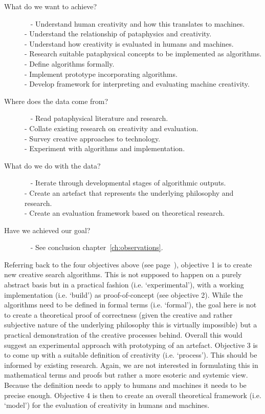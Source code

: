 \begin{description}
  \item[What do we want to achieve?]~
    - Understand human creativity and how this translates to machines.\\
    - Understand the relationship of pataphysics and creativity.\\
    - Understand how creativity is evaluated in humans and machines.\\
    - Research suitable pataphysical concepts to be implemented as algorithms.\\ 
    - Define algorithms formally.\\
    - Implement prototype incorporating algorithms.\\
    - Develop framework for interpreting and evaluating machine creativity.
	\item[Where does the data come from?]~
    - Read pataphysical literature and research.\\
    - Collate existing research on creativity and evaluation.\\
    - Survey creative approaches to technology.\\
    - Experiment with algorithms and implementation.
	\item[What do we do with the data?]~
    - Iterate through developmental stages of algorithmic outputs.\\
    - Create an artefact that represents the underlying philosophy and research.\\
    - Create an evaluation framework based on theoretical research.
  \item[Have we achieved our goal?]~
    - See conclusion chapter~\ref{ch:observations}.
\end{description}

Referring back to the four objectives above (see page~\pageref{s:objectives}), objective 1 is to create new creative search algorithms. This is not supposed to happen on a purely abstract basis but in a practical fashion (i.e. `experimental'), with a working implementation (i.e. `build') as proof-of-concept (see objective 2). While the algorithms need to be defined in formal terms (i.e. `formal'), the goal here is not to create a theoretical proof of correctness (given the creative and rather subjective nature of the underlying philosophy this is virtually impossible) but a practical demonstration of the creative processes behind. Overall this would suggest an experimental approach with prototyping of an artefact. Objective \num{3} is to come up with a suitable definition of creativity (i.e. `process'). This should be informed by existing research. Again, we are not interested in formulating this in mathematical terms and proofs but rather a more esoteric and systemic view. Because the definition needs to apply to humans and machines it needs to be precise enough. Objective \num{4} is then to create an overall theoretical framework (i.e. `model') for the evaluation of creativity in humans and machines.

